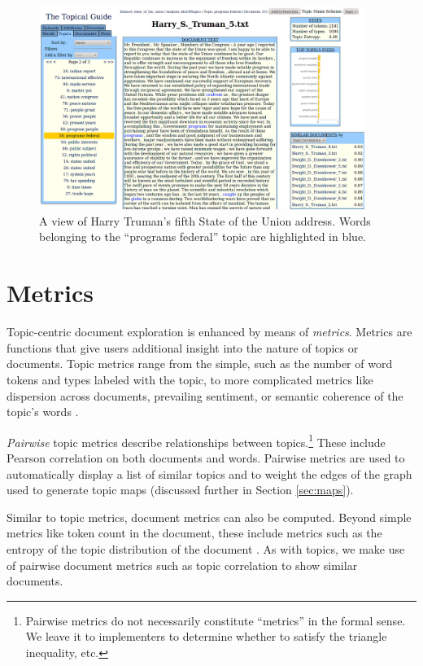 \documentclass[11pt]{article}
\begin{document}
\begin{figure}[t]
 \centering
 \includegraphics[width=400px,keepaspectratio=true]{./topic_document_view2.png}
 \caption{A view of Harry Truman's fifth State of the Union address. Words belonging to the ``programs federal'' topic are highlighted in blue.}
 \label{fig:topic_doc}
\end{figure}

\section{Metrics}
Topic-centric document exploration is enhanced by means of \textit{metrics}.
Metrics are functions that give users additional insight into the nature of
topics or documents. Topic metrics range from the simple, such as the number of word tokens and types labeled with the
topic, to more complicated metrics like dispersion across documents,
prevailing sentiment, or semantic coherence of the topic's words \cite{Newman2010Coherence}.

\textit{Pairwise} topic metrics describe relationships between
topics.\footnote{Pairwise metrics do not necessarily constitute
``metrics'' in the formal sense. We leave it to implementers to determine
whether to satisfy the triangle inequality, etc.} These include Pearson correlation on both documents and words.
Pairwise metrics are used to automatically display a list of similar topics and to weight
the edges of the graph used to generate topic maps (discussed further in Section
\ref{sec:maps}).

Similar to topic metrics, document metrics can also be computed.
Beyond simple metrics like token count in the document, these include
metrics such as the entropy of the topic distribution of the document \cite{Misra2008}. As
with topics, we make use of pairwise document metrics such as topic
correlation \cite{Blei2009} to show similar documents.
\end{document}
